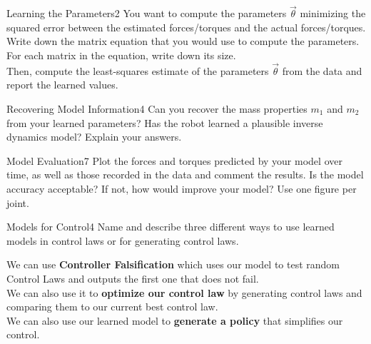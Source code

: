 \begin{questions}


\begin{question}{Learning the Parameters}{2}
You want to compute the parameters $\vec{\theta}$ minimizing the squared error between the estimated forces/torques and the actual forces/torques.
Write down the matrix equation that you would use to compute the parameters. For each matrix in the equation, write down its size.\\
Then, compute the least-squares estimate of the parameters $\vec{\theta}$ from the data and report the learned values.

\begin{answer}\end{answer}

\end{question}



\begin{question}{Recovering Model Information}{4}
	Can you recover the mass properties $m_{1}$ and $m_{2}$ from your learned parameters? Has the robot learned a plausible inverse dynamics model? Explain your answers.
	
\begin{answer}\end{answer}
\end{question}



\begin{question}{Model Evaluation}{7}
Plot the forces and torques predicted by your model over time, as well as those recorded in the data and comment the results. Is the model accuracy acceptable? If not, how would improve your model? Use one figure per joint.

\begin{answer}\end{answer}

\end{question}



\begin{question}[bonus]{Models for Control}{4}
Name and describe three different ways to use learned models in control laws or for generating control laws.

\begin{answer}
We can use \textbf{Controller Falsification} which uses our model to test random Control Laws and outputs the first one that does not fail.\\
We can also use it to \textbf{optimize our control law} by generating control laws and comparing them to our current best control law. \\
We can also use our learned model to \textbf{generate a policy} that simplifies our control.
\end{answer}

\end{question}


\end{questions}
